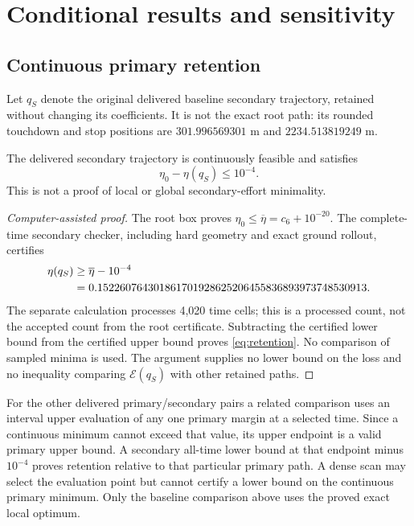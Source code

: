 \section{Conditional results and sensitivity}\label{sec:conditional}
\subsection{Continuous primary retention}
Let $q_S$ denote the original delivered baseline secondary trajectory, retained without changing its coefficients. It is not the exact root path: its rounded touchdown and stop positions are $301.996569301$ m and $2234.513819249$ m.

\begin{proposition}\label{prop:retention}
The delivered secondary trajectory is continuously feasible and satisfies
\begin{equation}\label{eq:retention}
 \eta_0-\eta(q_S)\leq10^{-4}.
\end{equation}
This is not a proof of local or global secondary-effort minimality.
\end{proposition}
\begin{proof}[Computer-assisted proof]
The root box proves $\eta_0\leq\overline\eta=c_6+10^{-20}$. The complete-time secondary checker, including hard geometry and exact ground rollout, certifies
\begin{align}\label{eq:retainedlevel}
 \eta(q_S)&\geq\overline\eta-10^{-4}\notag\\
 &=0.152260764301861701928625206455836893973748530913.
\end{align}
The separate calculation processes 4,020 time cells; this is a processed count, not the accepted count from the root certificate. Subtracting the certified lower bound from the certified upper bound proves \eqref{eq:retention}. No comparison of sampled minima is used. The argument supplies no lower bound on the loss and no inequality comparing $\mathcal E(q_S)$ with other retained paths.
\end{proof}

For the other delivered primary/secondary pairs a related comparison uses an interval upper evaluation of any one primary margin at a selected time. Since a continuous minimum cannot exceed that value, its upper endpoint is a valid primary upper bound. A secondary all-time lower bound at that endpoint minus $10^{-4}$ proves retention relative to that particular primary path. A dense scan may select the evaluation point but cannot certify a lower bound on the continuous primary minimum. Only the baseline comparison above uses the proved exact local optimum.


